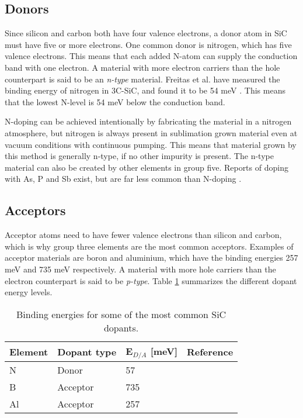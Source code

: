 \subsection{Donors}
Since silicon and carbon both have four valence electrons, a donor atom in SiC must have five or more electrons. One common donor is nitrogen, which has five valence electrons. This means that each added N-atom can supply the conduction band with one electron. A material with more electron carriers than the hole counterpart is said to be an \emph{n-type} material. Freitas et al. have measured the binding energy of nitrogen in 3C-SiC, and found it to be 54 meV \cite{Freitas1988}. This means that the lowest N-level is 54 meV below the conduction band. 

N-doping can be achieved intentionally by fabricating the material in a nitrogen atmosphere, but nitrogen is always present in sublimation grown material even at vacuum conditions with continuous pumping\cite{Sun2012b}. This means that material grown by this method is generally n-type, if no other impurity is present. The n-type material can also be created by other elements in group five. Reports of doping with As, P and Sb exist, but are far less common than N-doping \cite{Rao1999}. 

\subsection{Acceptors}
Acceptor atoms need to have fewer valence electrons than silicon and carbon, which is why group three elements are the most common acceptors. Examples of acceptor materials are boron and aluminium, which have the binding energies 257 meV \cite{Freitas1988} and 735 meV \cite{Richards2003} respectively. A material with more hole carriers than the electron counterpart is said to be \emph{p-type}. Table \ref{tab:dopants} summarizes the different dopant energy levels. 

\begin{table}[h]
\caption{Binding energies for some of the most common SiC dopants.}
\label{tab:dopants}
\begin{center}
\begin{tabular}{ l l l r}
  \hline                       
  \hline       
  \vspace{1mm}
    Element  & Dopant type & E$_{D/A}$ [meV] & Reference\\
    \hline
  N &  Donor & 57 & \cite{Freitas1988}\\
  B &  Acceptor & 735 & \cite{Richards2003}\\
  Al &  Acceptor & 257  & \cite{Freitas1988}\\
  \hline  
\end{tabular}
\end{center}
\end{table}

